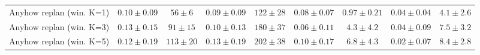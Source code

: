 \documentclass{uai2026} %
\newcommand{\1}{\mathbf{1}}
\begin{document}
\begin{table}[ht]
\begin{tabular}{@{}l|cc|cc|cc|cc@{}}
    Anyhow replan (win. K=1) & $0.10{\pm}0.09$               & $56{\pm}6$   & $0.09{\pm}0.09$ & $122{\pm}28$ & $0.08{\pm}0.07$ & $0.97{\pm}0.21$ & $0.04{\pm}0.04$ & $4.1{\pm}2.6$ \\
    Anyhow replan (win. K=3) & $0.13{\pm}0.15$               & $91{\pm}15$  & $0.10{\pm}0.13$ & $180{\pm}37$ & $0.06{\pm}0.11$ & $4.3{\pm}4.2$   & $0.04{\pm}0.09$ & $7.5{\pm}3.2$ \\
    Anyhow replan (win. K=5) & $0.12{\pm}0.19$               & $113{\pm}20$ & $0.13{\pm}0.19$ & $202{\pm}38$ & $0.10{\pm}0.17$ & $6.8{\pm}4.3$   & $0.02{\pm}0.07$ & $8.4{\pm}2.8$ \\
    \bottomrule
  \end{tabular}
\end{table}


% 
\end{document}
